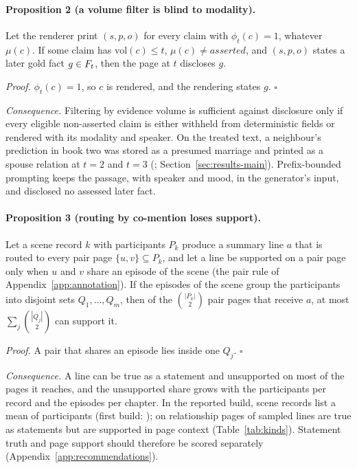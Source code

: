 \paragraph{Proposition 2 (a volume filter is blind to modality).}
Let the renderer print $(s,p,o)$ for every claim with $\phi_t(c)=1$, whatever $\mu(c)$.
If some claim has $\mathrm{vol}(c)\le t$, $\mu(c)\neq\textit{asserted}$, and $(s,p,o)$
states a later gold fact $g\in F_t$, then the page at $t$ discloses $g$.

\emph{Proof.} $\phi_t(c)=1$, so $c$ is rendered, and the rendering states $g$. $\square$

\emph{Consequence.} Filtering by evidence volume is sufficient against disclosure only if
every eligible non-asserted claim is either withheld from deterministic fields or rendered
with its modality and speaker. On the treated text, a neighbour's prediction in book two
was stored as a presumed marriage and printed as a spouse relation at $t=2$ and $t=3$
(; Section~\ref{sec:results-main}). Prefix-bounded prompting
keeps the passage, with speaker and mood, in the generator's input, and disclosed no
assessed later fact.

\paragraph{Proposition 3 (routing by co-mention loses support).}
Let a scene record $k$ with participants $P_k$ produce a summary line $a$ that is routed to
every pair page $\{u,v\}\subseteq P_k$, and let a line be supported on a pair page only when
$u$ and $v$ share an episode of the scene (the pair rule of Appendix~\ref{app:annotation}).
If the episodes of the scene group the participants into disjoint sets $Q_1,\dots,Q_m$, then
of the $\binom{|P_k|}{2}$ pair pages that receive $a$, at most
$\sum_{j}\binom{|Q_j|}{2}$ can support it.

\emph{Proof.} A pair that shares an episode lies inside one $Q_j$. $\square$

\emph{Consequence.} A line can be true as a statement and unsupported on most of the pages
it reaches, and the unsupported share grows with the participants per record and the
episodes per chapter. In the reported build, scene records list a mean of 
participants (first build: ); on relationship pages
 of sampled lines are true as statements but
 are supported in page context (Table~\ref{tab:kinds}). Statement
truth and page support should therefore be scored separately
(Appendix~\ref{app:recommendations}).
